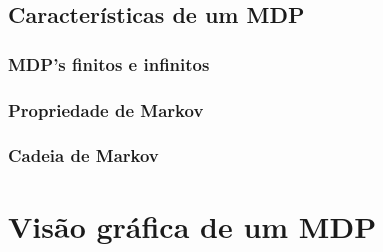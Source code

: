 \documentclass{article}
\begin{document}
        \subsection{Características de um MDP}
        
            \subsubsection{MDP's finitos e infinitos}
            
            \subsubsection{Propriedade de Markov}
            
            \subsubsection{Cadeia de Markov}
        
    \section{Visão gráfica de um MDP}
    
\end{document}

